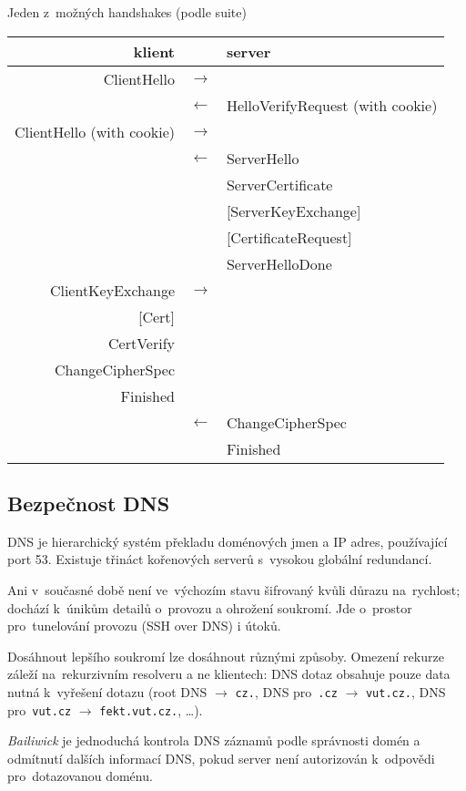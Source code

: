 Jeden z~možných handshakes (podle suite)
\begin{center}
\begin{tabular}{rcl}
	klient & & server \\
	\hline
	ClientHello & $\rightarrow$ & \\
	& \(\leftarrow\) & HelloVerifyRequest (with cookie) \\
    ClientHello (with cookie) & \(\rightarrow\) & \\
    & \(\leftarrow\) & ServerHello \\
	& & ServerCertificate \\
    & & [ServerKeyExchange] \\
    & & [CertificateRequest] \\
    & & ServerHelloDone \\
	ClientKeyExchange & \(\rightarrow\) & \\
    {[}Cert{]} & & \\
    CertVerify & & \\
    ChangeCipherSpec & & \\
	Finished & & \\
	& \(\leftarrow\) & ChangeCipherSpec \\
	& & Finished \\
\end{tabular}
\end{center}

\subsection{Bezpečnost DNS}

DNS je hierarchický systém překladu doménových jmen a IP adres, používající port 53.
Existuje třináct kořenových serverů s~vysokou globální redundancí.

Ani v~současné době není ve~výchozím stavu šifrovaný kvůli důrazu na~rychlost; dochází k~únikům detailů o~provozu a ohrožení soukromí.
Jde o~prostor pro~tunelování provozu (SSH over DNS) i útoků.

Dosáhnout lepšího soukromí lze dosáhnout různými způsoby.
Omezení rekurze záleží na~rekurzivním resolveru a ne klientech: DNS dotaz obsahuje pouze data nutná k~vyřešení dotazu (root DNS $\rightarrow$ \texttt{cz.}, DNS pro~\texttt{.cz} $\rightarrow$ \texttt{vut.cz.}, DNS pro~\texttt{vut.cz} $\rightarrow$ \texttt{fekt.vut.cz.}, \dots).

\emph{Bailiwick} je jednoduchá kontrola DNS záznamů podle správnosti domén a odmítnutí dalších informací DNS, pokud server není autorizován k~odpovědi pro~dotazovanou doménu.

